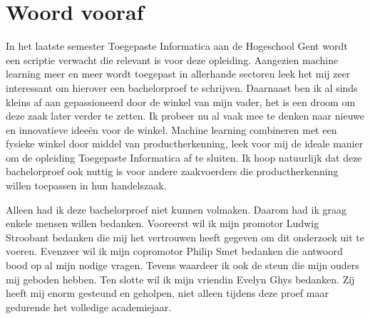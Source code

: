 
\chapter*{Woord vooraf}
\label{ch:voorwoord}


In het laatste semester Toegepaste Informatica aan de Hogeschool Gent wordt een scriptie verwacht die relevant is voor deze opleiding.  Aangezien machine learning meer en meer wordt toegepast in allerhande sectoren leek het mij zeer interessant om hierover een bachelorproef te schrijven.  Daarnaast ben ik al sinds kleins af aan gepassioneerd door de winkel van mijn vader, het is een droom om deze zaak later verder te zetten. Ik probeer nu al vaak mee te denken naar nieuwe en innovatieve ideeën voor de winkel. Machine learning combineren met een fysieke winkel door middel van productherkenning, leek voor mij de ideale manier om de opleiding Toegepaste Informatica af te sluiten. Ik hoop natuurlijk dat deze bachelorproef ook nuttig is voor andere zaakvoerders die productherkenning willen toepassen in hun handelszaak.

Alleen had ik deze bachelorproef niet kunnen volmaken. Daarom had ik graag enkele mensen willen bedanken. Vooreerst wil ik mijn promotor Ludwig Stroobant bedanken die mij het vertrouwen heeft gegeven om dit onderzoek uit te voeren. Evenzeer wil ik mijn copromotor Philip Smet bedanken die antwoord bood op al mijn nodige vragen. Tevens waardeer ik ook de steun die mijn ouders mij geboden hebben. Ten slotte wil ik mijn vriendin Evelyn Ghys bedanken. Zij heeft mij enorm gesteund en geholpen, niet alleen tijdens deze proef maar gedurende het volledige academiejaar. 
